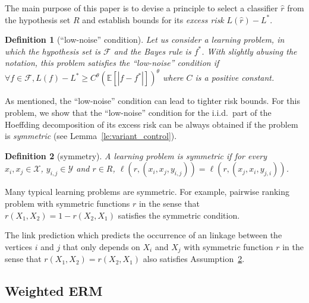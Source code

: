 \documentclass[letterpaper]{article} %
\def\LongVersion{}
\def\LongVersionEnd{}
\newtheorem{definition}{Definition}
\newcommand{\E}{\mathbb{E}}
\newcommand{\xspace}{\mathcal{X}}
\newcommand{\yspace}{\mathcal{Y}}
\newcommand{\bayeserror}{L^*}
\newcommand{\risk}{L}
\newcommand{\lossf}{\ell}
\begin{document}
The main purpose of this paper is to devise a principle to select a classifier $\hat{r}$ from the hypothesis set $R$ and establish bounds for its \emph{excess risk} $\risk(\hat{r}) - \bayeserror{}$.
\begin{definition}[``low-noise'' condition]
  \label{de:low-noise condition}
  Let us consider a learning problem, in which the hypothesis set is $\mathcal{F}$ and the Bayes rule is $f^*$. With slightly abusing the notation, this problem satisfies the ``low-noise'' condition if $\forall f\in \mathcal{F}, \risk{}(f) - \bayeserror{}\ge C^\theta(\E[|f-f^*|])^\theta$ where $C$ is a positive constant.
\end{definition}
As mentioned, the ``low-noise'' condition can lead to tighter risk bounds.
For this problem, we show that the ``low-noise'' condition for the i.i.d.\ part of the Hoeffding decomposition \cite{hoeffding1948class} of its excess risk can be always obtained if the problem is \emph{symmetric} (see Lemma~\ref{le:variant_control}).
\begin{definition}[symmetry]
    \label{con:symmetric}
    A learning problem is symmetric if for every $x_i,x_j\in \xspace{}$, $y_{i,j}\in \yspace{}$ and $r\in R$, $\lossf(r, (x_i,x_j,y_{i,j})) = \lossf(r, (x_j,x_i,y_{j,i}))$.
\end{definition}
Many typical learning problems are symmetric.
For example, pairwise ranking problem with symmetric functions $r$ in the sense that $r(X_1,X_2)=1-r(X_2,X_1)$ satisfies the symmetric condition. 
\LongVersion
The link prediction which predicts the occurrence of an linkage between the vertices $i$ and $j$ that only depends on $X_i$ and $X_j$ with symmetric function $r$ in the sense that $r(X_1,X_2)=r(X_2,X_1)$ also satisfies Assumption~\ref{con:symmetric}.
\LongVersionEnd

\subsection{Weighted ERM} %

\label{sub:weighted_empirical_risk_minimization}
\end{document}
